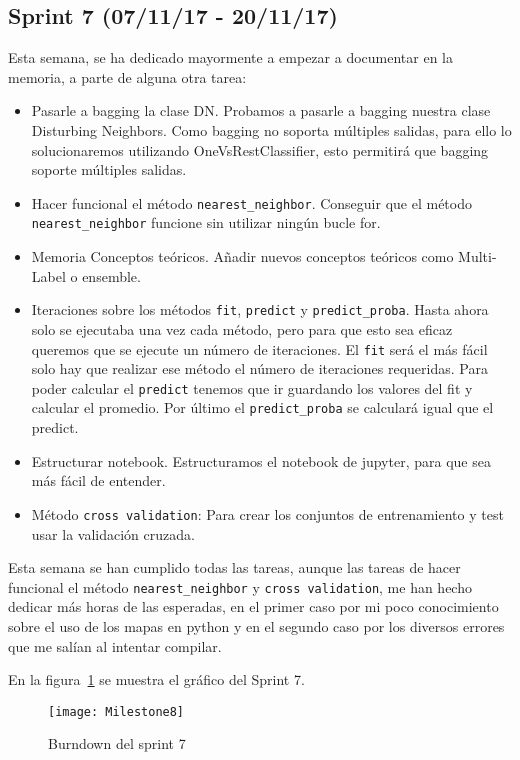 \subsection{Sprint 7 (07/11/17 - 20/11/17)}
Esta semana, se ha dedicado mayormente a empezar a documentar en la memoria, a parte de alguna otra tarea:
\begin{itemize}
\item Pasarle a bagging la clase DN. Probamos a pasarle a bagging nuestra clase Disturbing Neighbors. Como bagging no soporta múltiples salidas, para ello lo solucionaremos utilizando OneVsRestClassifier, esto permitirá que bagging soporte múltiples salidas.
\item Hacer funcional el método \texttt{nearest\_neighbor}. Conseguir que el método \texttt{nearest\_neighbor} funcione sin utilizar ningún bucle for.
\item Memoria Conceptos teóricos. Añadir nuevos conceptos teóricos como Multi-Label o ensemble.
\item Iteraciones sobre los métodos \texttt{fit}, \texttt{predict} y \texttt{predict\_proba}. Hasta ahora solo se ejecutaba una vez cada método, pero para que esto sea eficaz queremos que se ejecute un número de iteraciones. El \texttt{fit} será el más fácil solo hay que realizar ese método el número de iteraciones requeridas. Para poder calcular el \texttt{predict} tenemos que ir guardando los valores del fit y calcular el promedio. Por último el \texttt{predict\_proba} se calculará igual que el predict.
\item Estructurar notebook. Estructuramos el notebook de jupyter, para que sea más fácil de entender.
\item Método \texttt{cross validation}: Para crear los conjuntos de entrenamiento y test usar la validación cruzada.
\end{itemize}

Esta semana se han cumplido todas las tareas, aunque las tareas de hacer funcional el método \texttt{nearest\_neighbor} y \texttt{cross validation}, me han hecho dedicar más horas de las esperadas, en el primer caso por mi poco conocimiento sobre el uso de los mapas en python y en el segundo caso por los diversos errores que me salían al intentar compilar.

En la figura~\ref{fig:Milestone8} se muestra el gráfico del Sprint 7.

\begin{figure}
\centering
\texttt{[image: Milestone8]}
\caption{Burndown del sprint 7}
\label{fig:Milestone8}
\end{figure}

